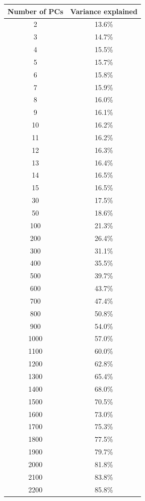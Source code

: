 \documentclass[12pt]{pnas-new}
\begin{document}
\clearpage
\begin{table}[htb!]
\centering
 \begin{tabular}{||c c||} 
 \hline
 Number of PCs & Variance explained  \\ [0.5ex] 
 \hline\hline
 2 & 13.6\% \\
\hline
3 & 14.7\% \\
\hline
4 & 15.5\% \\
\hline
5 & 15.7\% \\
\hline
6 & 15.8\% \\
\hline
7 & 15.9\% \\
\hline
8 & 16.0\% \\
\hline
9 & 16.1\% \\
\hline
10 & 16.2\% \\
\hline
11 & 16.2\% \\
\hline
12 & 16.3\% \\
\hline
13 & 16.4\% \\
\hline
14 & 16.5\% \\
\hline
15 & 16.5\% \\
\hline
30 & 17.5\% \\
\hline
50 & 18.6\% \\
\hline
100 & 21.3\% \\
\hline
200 & 26.4\% \\
\hline
300 & 31.1\% \\
\hline
400 & 35.5\% \\
\hline
500 & 39.7\% \\
\hline
600 & 43.7\% \\
\hline
700 & 47.4\% \\
\hline
800 & 50.8\% \\
\hline
900 & 54.0\% \\
\hline
1000 & 57.0\% \\
\hline
1100 & 60.0\% \\
\hline
1200 & 62.8\% \\
\hline
1300 & 65.4\% \\
\hline
1400 & 68.0\% \\
\hline
1500 & 70.5\% \\
\hline
1600 & 73.0\% \\
\hline
1700 & 75.3\% \\
\hline
1800 & 77.5\% \\
\hline
1900 & 79.7\% \\
\hline
2000 & 81.8\% \\
\hline
2100 & 83.8\% \\
\hline
2200 & 85.8\% \\

\end{tabular}
\end{table}
\end{document}
